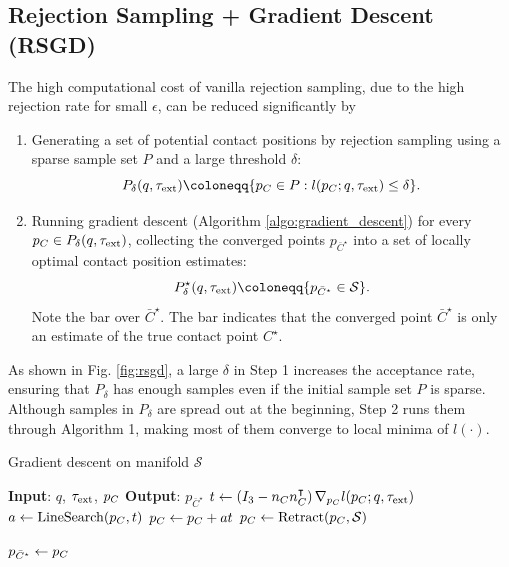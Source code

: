 \subsection{Rejection Sampling + Gradient Descent (RSGD)\label{sec:proposed_contact_estimator}}
The high computational cost of vanilla rejection sampling, due to the high rejection rate for small $\epsilon$, can be reduced significantly by
\begin{enumerate}
\item  Generating a set of potential contact positions by rejection sampling using a sparse sample set $P$ and a large threshold $\delta$: 
\begin{equation}
P_{\delta}(q, \tauE) \coloneqq \{\pCbar \in P : l(\pCbar; q, \tauE) \leq \delta\}.
\end{equation}

\item  Running gradient descent (Algorithm \ref{algo:gradient_descent}) for every $p_{C} \in P_{\delta}(q, \tau_{\text{ext}})$, collecting the converged points $p_{\bar{C}^\star}$ into a set of locally optimal contact position estimates: 
\begin{equation}
P^\star_{\delta}(q, \tauE) \coloneqq \{p_{\bar{C}^\star} \in \mathcal{S}\}. 
\end{equation}
Note the bar over $\bar{C}^\star$. The bar indicates that the converged point $\bar{C}^\star$ is only an estimate of the true contact point $C^\star$.
\end{enumerate}

As shown in Fig. \ref{fig:rsgd}, a large $\delta$ in Step 1 increases the acceptance rate, ensuring that $P_{\delta}$ has enough samples even if the initial sample set $P$ is sparse. Although samples in $P_{\delta}$ are spread out at the beginning, Step 2 runs them through Algorithm 1, making most of them converge to local minima of $l(\cdot)$.
\begin{algorithm}[h]
\caption{Gradient descent on manifold $\mathcal{S}$}\label{algo:gradient_descent}
\textbf{Input}: ${q}$, $\tau_{\text{ext}}$, $p_{C}$\; 
\textbf{Output}: $p_{\bar{C}^\star}$\;
 {
    ${t} \gets \left({I}_3 - {n}_C {n}_C^\intercal \right)\nabla_{p_{C}} l(p_{C}; q, \tau_{\text{ext}})$ \label{algo:gradient_descent:gradient_projection}\;
    $a \gets \mathrm{LineSearch}(p_{C}, {t})$ \label{algo:gradient_descent:line_search}\;
    $p_{C} \gets p_{C} + a {t}$\;
    $p_{C} \gets \mathrm{Retract}(p_{C}, \mathcal{S})$ \label{algo:gradient_descent:retract}\;
}

$p_{\bar{C}^\star} \gets p_{C}$\;
\end{algorithm}

